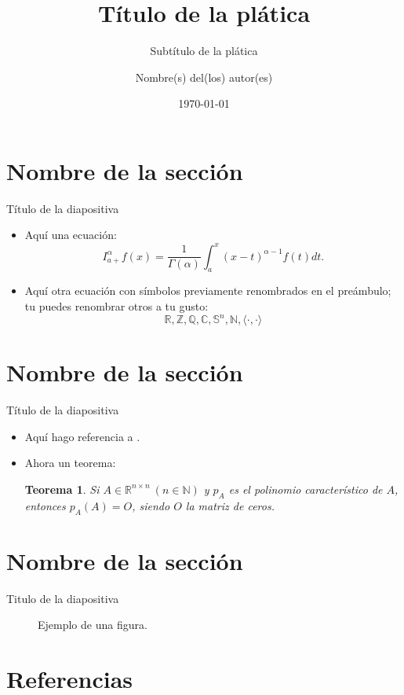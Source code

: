 \documentclass[notheorems]{beamer}
\title{Título de la plática}
\subtitle{Subtítulo de la plática}
\author{Nombre(s) del(los) autor(es)}
\institute{Universidad Autónoma de Yucatán}
\date{\today}
\newcommand{\C}{\mathbb{C}}
\newcommand{\R}{\mathbb{R}}
\newcommand{\Q}{\mathbb{Q}}
\newcommand{\Z}{\mathbb{Z}}
\newcommand{\N}{\mathbb{N}}
\newcommand{\Sf}{\mathbb{S}}
\newcommand{\br}{\langle}
\newcommand{\ke}{\rangle}
\newtheorem{teo}{Teorema}[section]
\begin{document}
\frame{\titlepage}

\frame{\tableofcontents}



\section{Nombre de la sección}

\begin{frame}{Título de la diapositiva}
\begin{itemize}
    \item Aquí una ecuación:
\pause
\begin{equation*}
I_{a+}^{\alpha}f(x)=\frac{1}{\Gamma(\alpha)}\int_a^x(x-t)^{\alpha-1}f(t)dt.
\end{equation*}
\vspace{0.5 cm}
\pause
\item Aquí otra ecuación con símbolos previamente renombrados en el preámbulo; tu puedes renombrar otros a tu gusto:
\begin{equation*}   \R,\Z,\Q,\C,\Sf^n,\N,\br\cdot,\cdot\ke
\end{equation*}
\end{itemize}
\end{frame}
\section{Nombre de la sección}
\begin{frame}{Título de la diapositiva}
    \begin{itemize}
        \item Aquí hago referencia a \cite{stein2010complex}.
        \pause\item Ahora un teorema:
        \pause\begin{teo}\label{teo_ejemplo}
            Si $A\in \R^{n\times n} ~(n\in\N)$ y $p_A$ es el polinomio característico de $A$, entonces $p_A(A)=O$, siendo $O$ la matriz de ceros. 
        \end{teo}
    \end{itemize}
\end{frame}
\section{Nombre de la sección}
\begin{frame}{Titulo de la diapositiva}
    \begin{figure}
        \centering
        
        \caption{Ejemplo de una figura.}
        \label{fig_ejemplo}
    \end{figure}
\end{frame}
\section{Referencias}
\begin{frame}
\printbibliography    
\end{frame}
\end{document}
